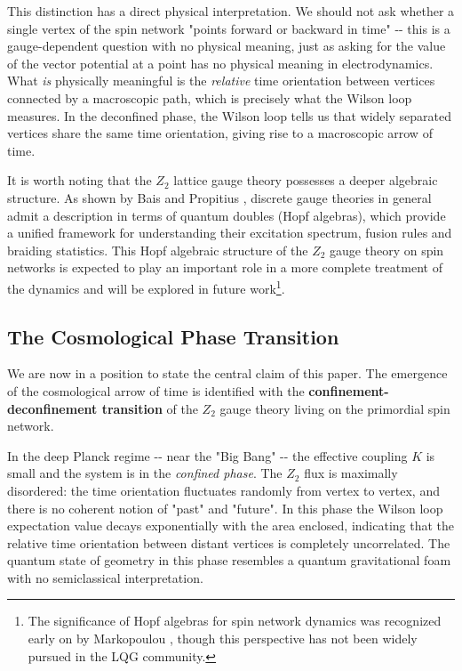 This distinction has a direct physical interpretation. We should not ask whether a single vertex of the spin network "points forward or backward in time" -\/- this is a gauge-dependent question with no physical meaning, just as asking for the value of the vector potential at a point has no physical meaning in electrodynamics. What \emph{is} physically meaningful is the \emph{relative} time orientation between vertices connected by a macroscopic path, which is precisely what the Wilson loop measures. In the deconfined phase, the Wilson loop tells us that widely separated vertices share the same time orientation, giving rise to a macroscopic arrow of time.

It is worth noting that the \(Z_2\) lattice gauge theory possesses a deeper algebraic structure. As shown by Bais and Propitius \cite{Propitius1996Discrete}, discrete gauge theories in general admit a description in terms of quantum doubles (Hopf algebras), which provide a unified framework for understanding their excitation spectrum, fusion rules and braiding statistics. This Hopf algebraic structure of the \(Z_2\) gauge theory on spin networks is expected to play an important role in a more complete treatment of the dynamics and will be explored in future work\footnote{The significance of Hopf algebras for spin network dynamics was recognized early on by Markopoulou \cite{Markopoulou1997Dual,Markopoulou2000Quantum}, though this perspective has not been widely pursued in the LQG community.}.

\subsection{The Cosmological Phase Transition}\label{subsec:cosmological-transition}

We are now in a position to state the central claim of this paper. The emergence of the cosmological arrow of time is identified with the \textbf{confinement-deconfinement transition} of the \(Z_2\) gauge theory living on the primordial spin network.

In the deep Planck regime -\/- near the "Big Bang" -\/- the effective coupling \(K\) is small and the system is in the \emph{confined phase}. The \(Z_2\) flux is maximally disordered: the time orientation fluctuates randomly from vertex to vertex, and there is no coherent notion of "past" and "future". In this phase the Wilson loop expectation value decays exponentially with the area enclosed, indicating that the relative time orientation between distant vertices is completely uncorrelated. The quantum state of geometry in this phase resembles a quantum gravitational foam with no semiclassical interpretation.

